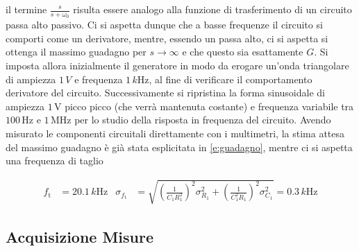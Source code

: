 \documentclass[a4paper,11pt]{article} %
\begin{document}
\noindent  il termine $\frac{s}{s+\omega_{0}}$ risulta essere analogo alla funzione di trasferimento di un circuito
passa alto passivo. Ci si aspetta dunque che a basse frequenze il circuito si comporti come un derivatore, mentre,
essendo un passa alto, ci si aspetta si ottenga il massimo guadagno per $s\rightarrow\infty$ e che questo sia
esattamente $G$. Si imposta allora inizialmente il generatore in modo da erogare un'onda triangolare di ampiezza
$1\,\si{V}$ e frequenza $1\,\si{k\Hz}$, al fine di verificare il comportamento derivatore del circuito. Successivamente
si ripristina la forma sinusoidale di ampiezza $1\,\si{\volt}$ picco picco (che verrà mantenuta costante) e frequenza
variabile tra $100\,\si{\Hz}$ e $1\,\si{\MHz}$ per lo studio della risposta in frequenza del circuito. Avendo misurato
le componenti circuitali direttamente con i multimetri, la stima attesa del massimo guadagno è già stata esplicitata in
\autoref{e:guadagno}, mentre ci si aspetta una frequenza di taglio

\begin{align}
	f_{\text{t}}&=20.1 \,\si{k\Hz} & \sigma_{f_{\text{t}}}&=\sqrt{	\left(\frac{1}{C_{1}R_{1}^2}\right)^2\sigma_{R_{1}}^2	+
																	\left(\frac{1}{C_{1}^2R_{1}}\right)^2\sigma_{C_{1}}^2   }
																	= 0.3 \,\si{k\Hz}	
\end{align}



\subsection{Acquisizione Misure}
\end{document}
